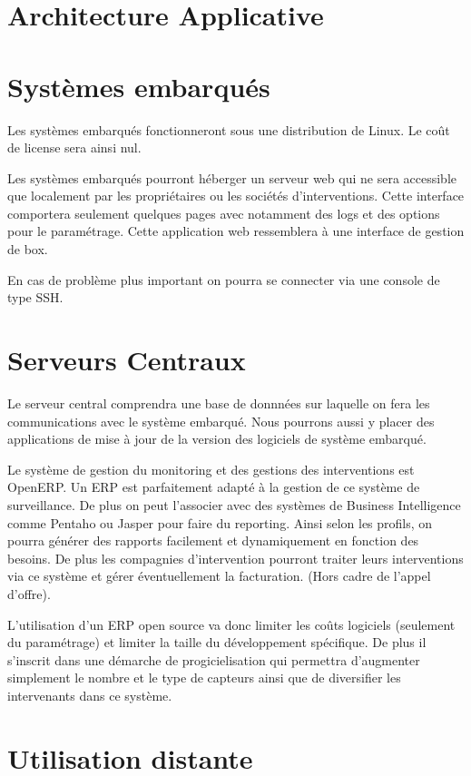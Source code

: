 \section{Architecture Applicative}

\section{Systèmes embarqués}

Les systèmes embarqués fonctionneront sous une distribution de Linux. Le coût de license sera ainsi nul. 

Les systèmes embarqués pourront héberger un serveur web qui ne sera accessible que localement par les propriétaires ou les sociétés d'interventions. Cette interface comportera seulement quelques pages avec notamment des logs et des options pour le paramétrage. Cette application web ressemblera à une interface de gestion de box.

En cas de problème plus important on pourra se connecter via une console de type SSH.

\section{Serveurs Centraux}

Le serveur central comprendra une base de donnnées sur laquelle on fera les communications avec le système embarqué. Nous pourrons aussi y placer des applications de mise à jour de la version des logiciels de système embarqué. 

Le système de gestion du monitoring et des gestions des interventions est OpenERP. Un ERP est parfaitement adapté à la gestion de ce système de surveillance. De plus on peut l'associer avec des systèmes de Business Intelligence comme Pentaho ou Jasper pour faire du reporting. Ainsi selon les profils, on pourra générer des rapports facilement et dynamiquement en fonction des besoins. 
De plus les compagnies d'intervention pourront traiter leurs interventions via ce système et gérer éventuellement la facturation. (Hors cadre de l'appel d'offre).

L'utilisation d'un ERP open source va donc limiter les coûts logiciels (seulement du paramétrage) et limiter la taille du développement spécifique. De plus il s'inscrit dans une démarche de progicielisation qui permettra d'augmenter simplement le nombre et le type de capteurs ainsi que de diversifier les intervenants dans ce système.

\section{Utilisation distante}

